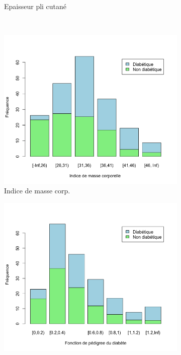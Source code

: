 \documentclass[a4paper,10pt]{report}
\begin{document}
\begin{figure}[H]
\begin{subfigure}[b]{0.25\linewidth}
		\caption{\scriptsize Epaisseur pli cutané}
		\label{fig:1-3-2-barplot-freq-diabete-pli-cutane}
	\end{subfigure}%
	\\
	\begin{subfigure}[b]{0.25\linewidth}
		\centering
		\captionsetup{justification=centering}
		\includegraphics[width=1\linewidth]{img/1-3-2-barplot-freq-diabete-ind-masse-corp}
		\caption{\scriptsize Indice de masse corp.}
		\label{fig:1-3-2-barplot-freq-diabete-ind-masse-corp}
	\end{subfigure}%
	\begin{subfigure}[b]{0.25\linewidth}
		\centering
		\captionsetup{justification=centering}
		\includegraphics[width=1\linewidth]{img/1-3-2-barplot-freq-diabete-pedigree}

\end{subfigure}
\end{figure}
\end{document}
